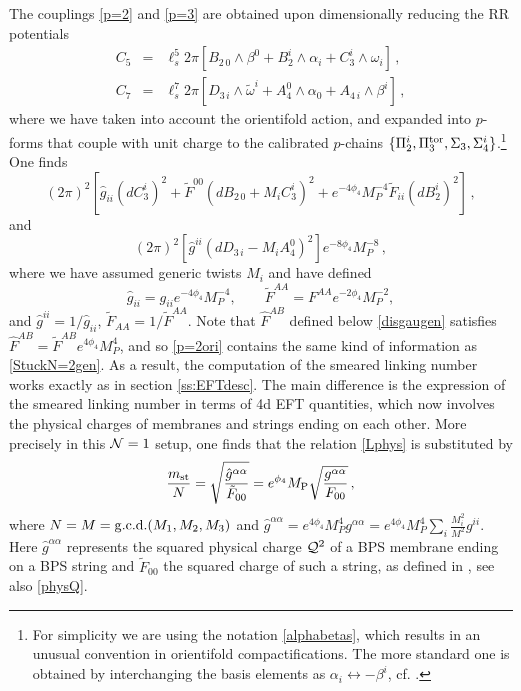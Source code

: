 \documentclass[11pt]{article}
\def\a {\alpha}
\def\b {\beta}
\def\CN {{\cal N}}
\def\be{\begin{equation}}
\def\ee{\end{equation}}
\def\bea{\begin{eqnarray}}
\def\eea{\end{eqnarray}}
\def\om{\omega}
\begin{document}
The couplings \eqref{p=2} and \eqref{p=3} are obtained upon dimensionally reducing the RR potentials
\bea
 C_5 & = &  \ell_s^{5} 2\pi \left[ B_{2\, 0} \wedge \b^0 + B_2^i \wedge \a_i  + C_3^i \wedge \om_i\right]\, , \\
 C_7 & = & \ell_s^{7} 2\pi \left[ D_{3\, i} \wedge \tilde{\om}^i + A_{4}^0 \wedge \a_0  + A_{4\, i}\wedge \b^i \right]\, ,
\eea
where we have taken into account the orientifold action, and expanded into $p$-forms that couple with unit charge to the calibrated $p$-chains $\{\Pi_2^i, \Pi_3^{\rm tor}, \Sigma_3 , \Sigma_4^i \}$.\footnote{For simplicity we are using the notation \eqref{alphabetas}, which results in an unusual convention in orientifold compactifications. The more standard one is obtained by interchanging the basis elements as $\a_i \leftrightarrow - \b^i$, cf. \cite[eq.(2.6)]{Camara:2005dc}.} One finds 
\be
(2\pi)^2 \left[ \hat{g}_{ii} (dC_3^i)^2 + \tilde{F}^{00}  \left(d B_{2\, 0} + M_i C_3^i \right)^2 + e^{-4\phi_4}M_P^{-4} \tilde{F}_{ii}  (dB_2^i)^2 \right]\, ,
\label{p=2ori}
\ee
and
\be
(2\pi)^2 \left[ \hat{g}^{ii} \left( d D_{3\, i} - M_i A_4^0 \right)^2 \right]  e^{-8\phi_4}M_P^{-8} \, ,
\label{p=3ori}
\ee
where we have assumed generic twists $M_i$ and have defined
\be
\hat{g}_{ii}=g_{ii} 
e^{-4\phi_4}M_P^{-4},\qquad
\tilde{F}^{AA} = F^{AA} 
e^{-2\phi_4} M_P^{-2}, 
\ee
and $\hat{g}^{ii}=1/\hat{g}_{ii}$, $\tilde{F}_{AA}=1/\tilde{F}^{AA}$. Note that $\hat{F}^{AB}$ defined below \eqref{disgaugen} satisfies $\hat{F}^{AB} = \tilde{F}^{AB} e^{4\phi_4}M_P^{4}$, and so \eqref{p=2ori} contains the same kind of information as \eqref{StuckN=2gen}. As a result, the computation of the smeared linking number works exactly as in section \ref{ss:EFTdesc}. The main difference is the expression of the smeared linking number in terms of 4d EFT quantities, which now involves the physical charges of membranes and strings ending on each other. More precisely in this $\CN=1$ setup, one finds that the relation \eqref{Lphys} is substituted by
\be
  \frac{m_{\rm st}}{N} =  \sqrt{\frac{\hat{g}^{\a\a}}{\tilde{F}_{00}}} = e^{\phi_4} M_{\rm P} \sqrt{\frac{{g}^{\a\a}}{{F}_{00}}}\, ,
\ee
where $N=M = {\rm g.c.d.} (M_1, M_2, M_3)$ and $\hat{g}^{\a\a} = e^{4\phi_4}M_P^{4} {g}^{\a\a} = e^{4\phi_4}M_P^{4} \sum_i \frac{M_i^{2}}{M^2} g^{ii} $. Here $\hat{g}^{\a\a}$ represents the squared physical charge ${\cal Q}^2$ of a BPS membrane ending on a BPS string and $\tilde{F}_{00}$ the squared charge of such a string, as defined in \cite{Lanza:2020qmt}, see also \eqref{physQ}.
\end{document}

